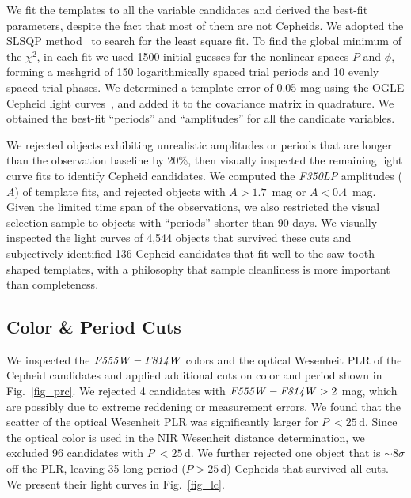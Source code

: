 \documentclass[twocolumn]{aastex63}
\newcommand{\hstw}{{\it F350LP} }
\newcommand{\hstv}{{\it F555W} }
\newcommand{\hsti}{{\it F814W} }
\begin{document}
We fit the templates to all the variable candidates and derived the best-fit parameters, despite the fact that most of them are not Cepheids. We adopted the SLSQP method~\citep{kraft1988software} to search for the least square fit. To find the global minimum of the $\chi^2$, in each fit we used 1500 initial guesses for the nonlinear spaces $P$ and $\phi$, forming a meshgrid of 150 logarithmically spaced trial periods and 10 evenly spaced trial phases. We determined a template error of 0.05 mag using the OGLE Cepheid light curves~\citep{2008AcA....58..163S}, and added it to the covariance matrix in quadrature. We obtained the best-fit ``periods'' and ``amplitudes'' for all the candidate variables.

We rejected objects exhibiting unrealistic amplitudes or periods that are longer than the observation baseline by 20\%, then visually inspected the remaining light curve fits to identify Cepheid candidates. We computed the \hstw amplitudes ($A$) of template fits, and rejected objects with $A>1.7$~mag or $A<0.4$~mag. Given the limited time span of the observations, we also restricted the visual selection sample to objects with ``periods'' shorter than 90 days. We visually inspected the light curves of 4,544 objects that survived these cuts and subjectively identified 136 Cepheid candidates that fit well to the saw-tooth shaped templates, with a philosophy that sample cleanliness is more important than completeness.

\subsection{Color \& Period Cuts}\label{sec_cep}

We inspected the $\hstv - \hsti$ colors and the optical Wesenheit PLR of the Cepheid candidates and applied additional cuts on color and period shown in Fig.~\ref{fig_prc}. We rejected 4 candidates with $\hstv - \hsti > 2$ mag, which are possibly due to extreme reddening or measurement errors. We found that the scatter of the optical Wesenheit PLR was significantly larger for $P\!~\!<25$\,d. Since the optical color is used in the NIR Wesenheit distance determination, we excluded 96 candidates with $P\!~\!<25$\,d. We further rejected one object that is $\sim$8$\sigma$ off the PLR, leaving 35 long period ($P\!>\!25$\,d) Cepheids that survived all cuts. We present their light curves in Fig.~\ref{fig_lc}.

\begin{figure*}
\caption{\hstw light curves of the 35 optically identified Cepheids ordered by period. The blue curves indicate the best-fit models. We plot two cycles of pulsation for visualization purposes.\label{fig_lc}}
\end{figure*}
\end{document}
